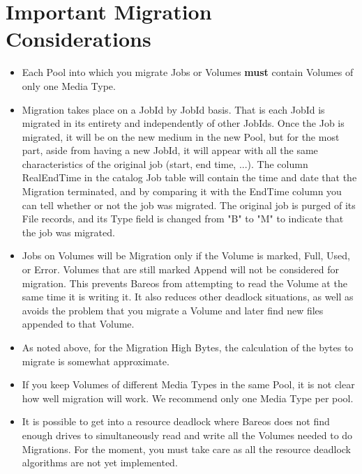\section{Important Migration Considerations}
\begin{itemize}
\item Each Pool into which you migrate Jobs or Volumes {\bf must}
      contain Volumes of only one Media Type.

\item Migration takes place on a JobId by JobId basis. That is
      each JobId is migrated in its entirety and independently
      of other JobIds. Once the Job is migrated, it will be
      on the new medium in the new Pool, but for the most part,
      aside from having a new JobId, it will appear with all the
      same characteristics of the original job (start, end time, ...).
      The column RealEndTime in the catalog Job table will contain the
      time and date that the Migration terminated, and by comparing
      it with the EndTime column you can tell whether or not the
      job was migrated.  The original job is purged of its File
      records, and its Type field is changed from "B" to "M" to
      indicate that the job was migrated.

\item Jobs on Volumes will be Migration only if the Volume is
      marked, Full, Used, or Error.  Volumes that are still
      marked Append will not be considered for migration. This
      prevents Bareos from attempting to read the Volume at
      the same time it is writing it. It also reduces other deadlock
      situations, as well as avoids the problem that you migrate a
      Volume and later find new files appended to that Volume.

\item As noted above, for the Migration High Bytes, the calculation
      of the bytes to migrate is somewhat approximate.

\item If you keep Volumes of different Media Types in the same Pool,
      it is not clear how well migration will work.  We recommend only
      one Media Type per pool.

\item It is possible to get into a resource deadlock where Bareos does
      not find enough drives to simultaneously read and write all the
      Volumes needed to do Migrations. For the moment, you must take
      care as all the resource deadlock algorithms are not yet implemented.


\end{itemize}

